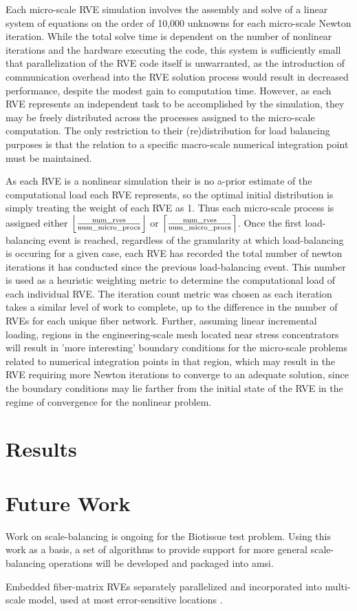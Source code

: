 \documentclass[11pt]{siamltex1213}
\DeclarePairedDelimiter\ceil{\lceil}{\rceil}
\DeclarePairedDelimiter\floor{\lfloor}{\rfloor}
\begin{document}
Each micro-scale RVE simulation involves the assembly and solve of a linear system of equations on the order of 10,000 unknowns for each micro-scale Newton iteration. While the total solve time is dependent on the number of nonlinear iterations and the hardware executing the code, this system is sufficiently small that parallelization of the RVE code itself is unwarranted, as the introduction of communication overhead into the RVE solution process would result in decreased performance, despite the modest gain to computation time. However, as each RVE represents an independent task to be accomplished by the simulation, they may be freely distributed across the processes assigned to the micro-scale computation. The only restriction to their (re)distribution for load balancing purposes is that the relation to a specific macro-scale numerical integration point must be maintained. 

As each RVE is a nonlinear simulation their is no a-prior estimate of the computational load each RVE represents, so the optimal initial distribution is simply treating the weight of each RVE as 1. Thus each micro-scale process is assigned either $\floor*{\frac{\text{num\_rves}}{\text{num\_micro\_procs}}}$ or $\ceil*{\frac{\text{num\_rves}}{\text{num\_micro\_procs}}}$. Once the first load-balancing event is reached, regardless of the granularity at which load-balancing is occuring for a given case, each RVE has recorded the total number of newton iterations it has conducted since the previous load-balancing event. This number is used as a heuristic weighting metric to determine the computational load of each individual RVE. The iteration count metric was chosen as each iteration takes a similar level of work to complete, up to the difference in the number of RVEs for each unique fiber network. Further, assuming linear incremental loading, regions in the engineering-scale mesh located near stress concentrators will result in 'more interesting' boundary conditions for the micro-scale problems related to numerical integration points in that region, which may result in the RVE requiring more Newton iterations to converge to an adequate solution, since the boundary conditions may lie farther from the initial state of the RVE in the regime of convergence for the nonlinear problem.

\section{Results}\label{results}

\section{Future Work}\label{future_work}

Work on scale-balancing is ongoing for the Biotissue test problem. Using this work as a basis, a set of algorithms to provide support for more general scale-balancing operations will be developed and packaged into amsi.

Embedded fiber-matrix RVEs separately parallelized and incorporated into multi-scale model, used at most error-sensitive locations \cite{lake2012mechanics} \cite{zhang2013cross} \cite{zhang2013coupled}.


\end{document}
